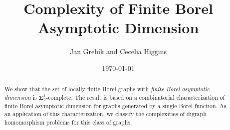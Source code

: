 \documentclass[psamsfonts]{amsart}
\theoremstyle{definition}
\theoremstyle{remark}
\numberwithin{equation}{section}
\newcommand\mbf{\mathbf}
\begin{document}
\author{Jan Grebík and Cecelia Higgins}

\address{JG: Faculty of Informatics, Masaryk University, Botanicka 68A, 60200 Brno, Czech Republic}

\address{CH: Department of Mathematics, University of California, Los Angeles, 520 Portola Plaza, Los Angeles, CA 90095, United States}
    
\title{Complexity of Finite Borel Asymptotic Dimension}
\date{\today}

\begin{abstract}
    We show that the set of locally finite Borel graphs with \emph{finite Borel asymptotic dimension} is $\mbf{\Sigma}^1_2$-complete.
    The result is based on a combinatorial characterization of finite Borel asymptotic dimension for graphs generated by a single Borel function.
    As an application of this characterization, we classify the complexities of digraph homomorphism problems for this class of graphs.
\end{abstract}

\maketitle
\end{document}
